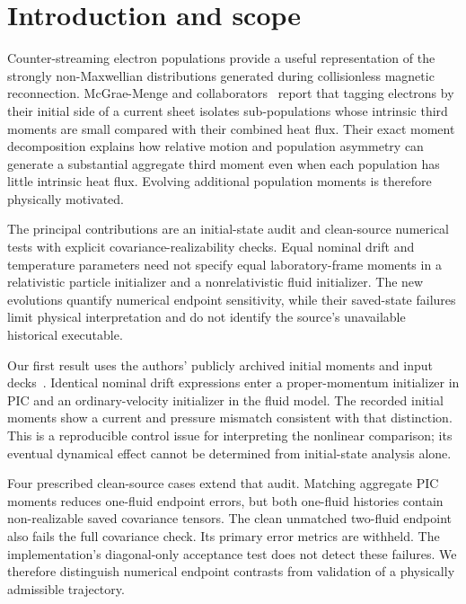 \section{Introduction and scope}
\label{sec:introduction}
Counter-streaming electron populations provide a useful representation of the
strongly non-Maxwellian distributions generated during collisionless magnetic
reconnection. McGrae-Menge and collaborators~\cite{original} report that tagging
electrons by their initial side of a current sheet isolates sub-populations
whose intrinsic third moments are small compared with their combined heat
flux. Their exact moment decomposition explains how relative motion and
population asymmetry can generate a substantial aggregate third moment even
when each population has little intrinsic heat flux. Evolving additional
population moments is therefore physically motivated.

The principal contributions are an initial-state audit and clean-source
numerical tests with explicit covariance-realizability checks. Equal nominal drift and
temperature parameters need not specify equal laboratory-frame moments in a
relativistic particle initializer and a nonrelativistic fluid initializer.
The new evolutions quantify numerical endpoint sensitivity, while their
saved-state failures limit physical interpretation and do not identify the
source's unavailable historical executable.

Our first result uses the authors' publicly archived initial moments and input
decks~\cite{dataset}. Identical nominal drift expressions enter a proper-momentum
initializer in PIC and an ordinary-velocity initializer in the fluid model.
The recorded initial moments show a current and pressure mismatch consistent
with that distinction. This is a reproducible control issue for interpreting
the nonlinear comparison; its eventual dynamical effect cannot be determined
from initial-state analysis alone.

Four prescribed clean-source cases extend that audit. Matching aggregate
PIC moments reduces one-fluid endpoint errors, but both one-fluid histories
contain non-realizable saved covariance tensors. The clean unmatched
two-fluid endpoint also fails the full covariance check. Its primary error
metrics are withheld. The implementation's diagonal-only acceptance test
does not detect these failures. We therefore distinguish numerical endpoint
contrasts from validation of a physically admissible trajectory.


